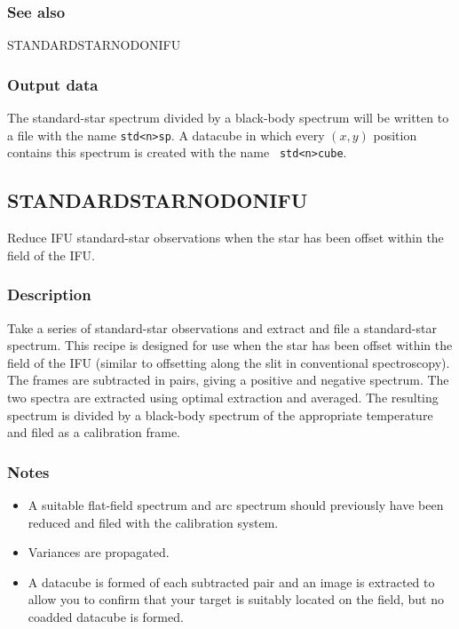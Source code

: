 \documentclass[twoside,11pt]{article}
\renewcommand{\_}{\texttt{\symbol{95}}}
\begin{document}
\subsubsection*{See also}

STANDARD\_STAR\_NOD\_ON\_IFU

\subsubsection*{Output data}

The standard-star spectrum divided by a black-body spectrum will be written to
a file with the name {\tt std\_<n>\_sp}. A datacube in which every
$(x,y)$ position contains this spectrum is created with the name {\tt
  std\_<n>\_cube}.

\clearpage



\subsection{STANDARD\_STAR\_NOD\_ON\_IFU}

Reduce IFU standard-star observations when the star
has been offset within the field of the IFU.

\subsubsection*{Description}

Take a series of standard-star observations and extract and file a
standard-star spectrum. This recipe is designed for use when the star
has been offset within the field of the IFU (similar to offsetting
along the slit in conventional spectroscopy). The frames are
subtracted in pairs, giving a positive and negative spectrum. The two
spectra are extracted using optimal extraction and averaged. The
resulting spectrum is divided by a black-body spectrum of the
appropriate temperature and filed as a calibration frame.

\subsubsection*{Notes}\begin{itemize}
\item

A suitable flat-field spectrum and arc spectrum should previously have
been reduced and filed with the calibration system.

\item

  Variances are propagated.

\item

A datacube is formed of each subtracted pair and an image is extracted
to allow you to confirm that your target is suitably located on the
field, but no coadded datacube is formed.

\end{itemize}
\end{document}
